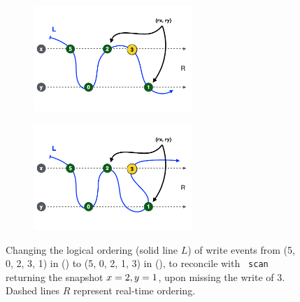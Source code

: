 \begin{figure}
\captionsetup[subfigure]{justification=centering}
\begin{subfigure}[t]{0.48\textwidth}
\includegraphics[height=4cm]{res/relink-before2.pdf}
\caption{\label{fig:reorder:before}} %
\end{subfigure} \hfill
\begin{subfigure}[t]{0.48\textwidth}
\includegraphics[height=4cm]{res/relink-after2.pdf}
\caption{\label{fig:reorder:after}} %
\end{subfigure}%
%
\caption{\label{fig:reorder} Changing the logical ordering (solid line $L$) of write
  events from (5, 0, 2, 3, 1) in () to (5,
  0, 2, 1, 3) in (), to reconcile with {\tt
    scan} returning the snapshot $x=2, y=1$, upon missing the write
  of $3$. Dashed lines $R$ represent real-time ordering.}
\end{figure}
